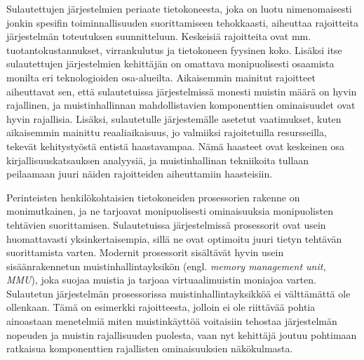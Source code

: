 Sulautettujen järjestelmien periaate tietokoneesta, joka on luotu nimenomaisesti jonkin spesifin toiminnallisuuden suorittamiseen tehokkaasti, aiheuttaa rajoitteita järjestelmän toteutuksen suunnitteluun. Keskeisiä rajoitteita ovat mm. tuotantokustannukset, virrankulutus ja tietokoneen fyysinen koko. Lisäksi itse sulautettujen järjestelmien kehittäjän on omattava monipuolisesti osaamista monilta eri teknologioiden osa-alueilta.\cite{rtcfes2015book} Aikaisemmin mainitut rajoitteet aiheuttavat sen, että sulautetuissa järjestelmissä monesti muistin määrä on hyvin rajallinen, ja muistinhallinnan mahdollistavien komponenttien ominaisuudet ovat hyvin rajallisia. Lisäksi, sulautetulle järjestemälle asetetut vaatimukset, kuten aikaisemmin mainittu reaaliaikaisuus, jo valmiiksi rajoitetuilla resursseilla, tekevät kehitystyöstä entistä haastavampaa. Nämä haasteet ovat keskeinen osa kirjallisuuskatsauksen analyysiä, ja muistinhallinan tekniikoita tullaan peilaamaan juuri näiden rajoitteiden aiheuttamiin haasteisiin.

Perinteisten henkilökohtaisien tietokoneiden prosessorien rakenne on monimutkainen, ja ne tarjoavat monipuolisesti ominaisuuksia monipuolisten tehtävien suorittamisen. Sulautetuissa järjestelmissä prosessorit ovat usein huomattavasti yksinkertaisempia, sillä ne ovat optimoitu juuri tietyn tehtävän suorittamista varten. Modernit prosessorit sisältävät hyvin usein sisäänrakennetun muistinhallintayksikön (engl. \textit{memory management unit, MMU}), joka suojaa muistia ja tarjoaa virtuaalimuistin moniajoa varten. Sulautetun järjestelmän prosessorissa muistinhallintayksikköä ei välttämättä ole ollenkaan.\cite{rtcfes2015book} Tämä on esimerkki rajoitteesta, jolloin ei ole riittävää pohtia ainoastaan menetelmiä miten muistinkäyttöä voitaisiin tehostaa järjestelmän nopeuden ja muistin rajallisuuden puolesta, vaan nyt kehittäjä joutuu pohtimaan ratkaisua komponenttien rajallisten ominaisuuksien näkökulmasta.